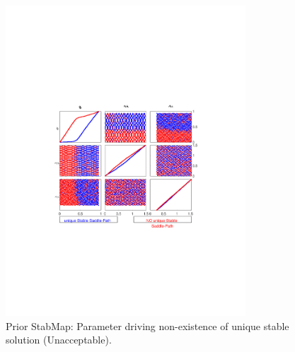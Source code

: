 
\begin{figure}[H]
\centering 
\includegraphics[width=0.8\textwidth]{fiscal/gsa/fiscal_prior_stable}
\caption{Prior StabMap: Parameter driving non-existence of unique stable solution (Unacceptable).}\label{Fig:fiscal_prior_stable}
\end{figure}

